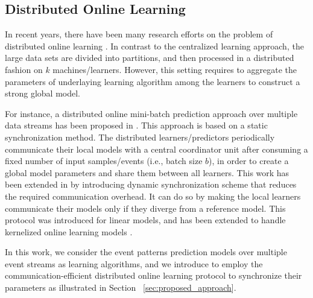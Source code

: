 
\subsection{Distributed Online Learning}

\par In recent years, there have been many research efforts on the problem of distributed online learning  \cite{tekin2014distributed,yan2013distributed,xiao2010dual,dekel2012optimal,kamp2014communication}.  In contrast to the centralized learning approach, the large data sets are divided into partitions, and then processed in a distributed fashion on $k$ machines/learners. However, this setting requires to aggregate the parameters of underlaying learning algorithm among the learners to construct a strong global model. 
\par For instance, a distributed online mini-batch prediction approach over multiple data streams has been proposed in \cite{dekel2012optimal}. This approach is based on a static synchronization method. The distributed learners/predictors periodically communicate  their local models with a central coordinator unit after consuming a fixed number of input samples/events (i.e., batch size $b$), in order to  create a global model parameters and share them between all learners. This work has been extended in \cite{kamp2014communication} by introducing  dynamic synchronization scheme that reduces the required communication overhead. It can do so by making the local learners communicate their models only if they diverge from a reference model. This protocol was introduced for linear models, and has been extended to handle kernelized online learning models \cite{kamp2016communication}.  

\par In this work, we consider the event patterns prediction models over multiple event streams as learning algorithms, and we introduce to employ the communication-efficient distributed online learning protocol \cite{kamp2014communication} to synchronize their parameters as illustrated in Section ~\ref{sec:proposed_approach}. 
